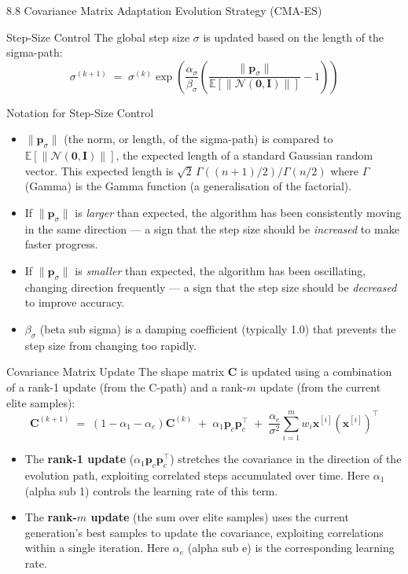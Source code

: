 \documentclass[aspectratio=169,10pt]{beamer}
\begin{document}
\begin{frame}[allowframebreaks]{8.8 Covariance Matrix Adaptation Evolution Strategy (CMA-ES)}
\framebreak

\begin{block}{Step-Size Control}
The global step size $\sigma$ is updated based on the length of the sigma-path:
\[
  \sigma^{(k+1)} \;=\; \sigma^{(k)} \exp\!\left(\frac{\alpha_\sigma}{\beta_\sigma}\left(
    \frac{\|\mathbf{p}_\sigma\|}{\mathbb{E}[\|\mathcal{N}(\mathbf{0},\mathbf{I})\|]} - 1\right)\right)
\]
\end{block}

\begin{block}{Notation for Step-Size Control}
\begin{itemize}
  \item $\|\mathbf{p}_\sigma\|$ (the norm, or length, of the sigma-path) is compared to $\mathbb{E}[\|\mathcal{N}(\mathbf{0},\mathbf{I})\|]$, the expected length of a standard Gaussian random vector. This expected length is $\sqrt{2}\,\Gamma((n+1)/2)/\Gamma(n/2)$ where $\Gamma$ (Gamma) is the Gamma function (a generalisation of the factorial).
  \item If $\|\mathbf{p}_\sigma\|$ is \emph{larger} than expected, the algorithm has been consistently moving in the same direction --- a sign that the step size should be \emph{increased} to make faster progress.
  \item If $\|\mathbf{p}_\sigma\|$ is \emph{smaller} than expected, the algorithm has been oscillating, changing direction frequently --- a sign that the step size should be \emph{decreased} to improve accuracy.
  \item $\beta_\sigma$ (beta sub sigma) is a damping coefficient (typically 1.0) that prevents the step size from changing too rapidly.
\end{itemize}
\end{block}

\begin{block}{Covariance Matrix Update}
The shape matrix $\mathbf{C}$ is updated using a combination of a rank-1 update (from the C-path) and a rank-$m$ update (from the current elite samples):
\[
  \mathbf{C}^{(k+1)} \;=\; (1-\alpha_1-\alpha_e)\mathbf{C}^{(k)}
  \;+\; \alpha_1 \mathbf{p}_c \mathbf{p}_c^\top
  \;+\; \frac{\alpha_e}{\sigma^2}\sum_{i=1}^{m} w_i \mathbf{x}^{[i]}(\mathbf{x}^{[i]})^\top
\]
\begin{itemize}
  \item The \textbf{rank-1 update} ($\alpha_1 \mathbf{p}_c \mathbf{p}_c^\top$) stretches the covariance in the direction of the evolution path, exploiting correlated steps accumulated over time. Here $\alpha_1$ (alpha sub 1) controls the learning rate of this term.
  \item The \textbf{rank-$m$ update} (the sum over elite samples) uses the current generation's best samples to update the covariance, exploiting correlations within a single iteration. Here $\alpha_e$ (alpha sub e) is the corresponding learning rate.
\end{itemize}
\end{block}


\end{frame}
\end{document}
